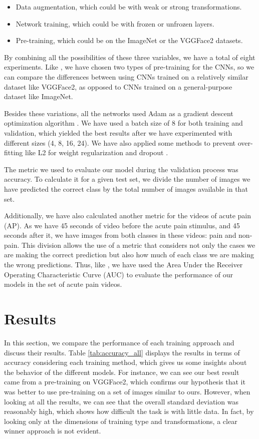 \begin{itemize}
    \item Data augmentation, which could be with weak or strong transformations.
    
    \item Network training, which could be with frozen or unfrozen layers.
    
    \item Pre-training, which could be on the ImageNet or the VGGFace2 datasets.
\end{itemize}
By combining all the possibilities of these three variables, we have a total of eight experiments. Like \cite{abs-1807-01631}, we have chosen two types of pre-training for the CNNs, so we can compare the differences between using CNNs trained on a relatively similar dataset like VGGFace2, as opposed to CNNs trained on a general-purpose dataset like ImageNet.

Besides these variations, all the networks used Adam as a gradient descent optimization algorithm \citep{KingmaB14}. We have used a batch size of 8 for both training and validation, which yielded the best results after we have experimented with different sizes (4, 8, 16, 24). We have also applied some methods to prevent over-fitting like L2 for weight regularization \citep{Ng2004} and dropout \citep{SrivastavaHKSS14}.

The metric we used to evaluate our model during the validation process was accuracy. To calculate it for a given test set, we divide the number of images we have predicted the correct class by the total number of images available in that set.

Additionally, we have also calculated another metric for the videos of acute pain (AP). As we have 45 seconds of video before the acute pain stimulus, and 45 seconds after it, we have images from both classes in these videos: pain and non-pain.  This division allows the use of a metric that considers not only the cases we are making the correct prediction but also how much of each class we are making the wrong predictions. Thus, like \cite{abs-1807-01631}, we have used the Area Under the Receiver Operating Characteristic Curve (AUC) to evaluate the performance of our models in the set of acute pain videos.

\section{Results}

In this section, we compare the performance of each training approach and discuss their results. Table \ref{tab:accuracy_all} displays the results in terms of accuracy considering each training method, which gives us some insights about the behavior of the different models. For instance, we can see our best result came from a pre-training on VGGFace2, which confirms our hypothesis that it was better to use pre-training on a set of images similar to ours. However, when looking at all the results, we can see that the overall standard deviation was reasonably high, which shows how difficult the task is with little data. In fact, by looking only at the dimensions of training type and transformations, a clear winner approach is not evident.

